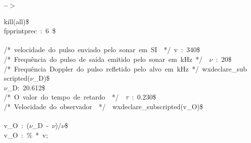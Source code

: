 \documentclass[fleqn]{article}
\begin{document}
\noindent
\begin{minipage}[t]{4.000000em}\color{red}\bfseries
 --\ensuremath{\ensuremath{>}}	
\end{minipage}
\begin{minipage}[t]{\textwidth}\color{blue}
kill(all)\$\\
fpprintprec\ :\ 6\ \$\\
\\
/*\ velocidade\ do\ pulso\ enviado\ pelo\ sonar\ em\ SI\ \ */\ v\ :\ 340\$\\
/*\ Frequência\ do\ pulso\ de\ saída\ emitido\ pelo\ sonar\ em\ kHz\ */\ \ \ensuremath{\nu}\ :\ 20\$\\
/*\ Frequência\ Doppler\ do\ pulso\ refletido\ pelo\ alvo\ em\ kHz\ */\ wxdeclare\_subscripted(\ensuremath{\nu}\_D)\$\ \\
\ensuremath{\nu}\_D:\ 20.612\$\\
/*\ O\ valor\ do\ tempo\ de\ retardo\ \ */\ \ \ensuremath{\tau}\ :\ 0.230\$\\
/*\ Velocidade\ do\ observador\ \ */\ \ wxdeclare\_subscripted(v\_O)\$\\
\\
v\_O\ :\ (\ensuremath{\nu}\_D\ -\ \ensuremath{\nu})/\ensuremath{\nu}\$\\
v\_O\ :\ \%\ *\ v;
\end{minipage}

\noindent%
\end{document}
